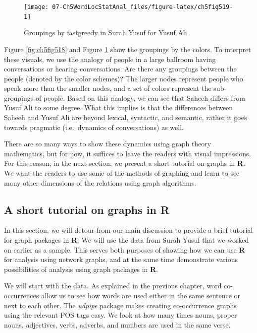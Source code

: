 \documentclass[
]{article}
\begin{document}
\begin{figure}

{\centering \texttt{[image: 07-Ch5WordLocStatAnal\_files/figure-latex/ch5fig519-1]} 

}

\caption{Groupings by fastgreedy in Surah Yusuf for Yusuf Ali}\label{fig:ch5fig519}
\end{figure}

Figure \ref{fig:ch5fig518} and Figure \ref{fig:ch5fig519} show the groupings by the colors. To interpret these visuals, we use the analogy of people in a large ballroom having conversations or hearing conversations. Are there any groupings between the people (denoted by the color schemes)? The larger nodes represent people who speak more than the smaller nodes, and a set of colors represent the sub-groupings of people. Based on this analogy, we can see that Saheeh differs from Yusuf Ali to some degree. What this implies is that the differences between Saheeh and Yusuf Ali are beyond lexical, syntactic, and semantic, rather it goes towards pragmatic (i.e.~dynamics of conversations) as well.

There are so many ways to show these dynamics using graph theory mathematics, but for now, it suffices to leave the readers with visual impressions. For this reason, in the next section, we present a short tutorial on graphs in \textbf{R}. We want the readers to use some of the methods of graphing and learn to see many other dimensions of the relations using graph algorithms.

\hypertarget{a-short-tutorial-on-graphs-in-R}{%
\subsection{\texorpdfstring{A short tutorial on graphs in \textbf{R}}{A short tutorial on graphs in R}}\label{a-short-tutorial-on-graphs-in-R}}

In this section, we will detour from our main discussion to provide a brief tutorial for graph packages in \textbf{R}. We will use the data from Surah Yusuf that we worked on earlier as a sample. This serves both purposes of showing how we can use \textbf{R} for analysis using network graphs, and at the same time demonstrate various possibilities of analysis using graph packages in \textbf{R}.

We will start with the data. As explained in the previous chapter, word co-occurrences allow us to see how words are used either in the same sentence or next to each other. The \emph{udpipe} package makes creating co-occurrence graphs using the relevant POS tags easy. We look at how many times nouns, proper nouns, adjectives, verbs, adverbs, and numbers are used in the same verse.
\end{document}
